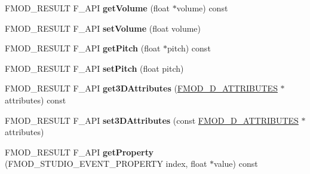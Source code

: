 \begin{DoxyCompactItemize}
\item 
\hypertarget{class_f_m_o_d_1_1_studio_1_1_event_instance_a12876c3f0379b18c434218aa504efe32}{F\+M\+O\+D\+\_\+\+R\+E\+S\+U\+L\+T F\+\_\+\+A\+P\+I {\bfseries get\+Volume} (float $\ast$volume) const }\label{class_f_m_o_d_1_1_studio_1_1_event_instance_a12876c3f0379b18c434218aa504efe32}

\item 
\hypertarget{class_f_m_o_d_1_1_studio_1_1_event_instance_af4c5ace0dce477110e154df958b27e21}{F\+M\+O\+D\+\_\+\+R\+E\+S\+U\+L\+T F\+\_\+\+A\+P\+I {\bfseries set\+Volume} (float volume)}\label{class_f_m_o_d_1_1_studio_1_1_event_instance_af4c5ace0dce477110e154df958b27e21}

\item 
\hypertarget{class_f_m_o_d_1_1_studio_1_1_event_instance_a3e74ea0004f54744ad382e274b712463}{F\+M\+O\+D\+\_\+\+R\+E\+S\+U\+L\+T F\+\_\+\+A\+P\+I {\bfseries get\+Pitch} (float $\ast$pitch) const }\label{class_f_m_o_d_1_1_studio_1_1_event_instance_a3e74ea0004f54744ad382e274b712463}

\item 
\hypertarget{class_f_m_o_d_1_1_studio_1_1_event_instance_ae03be8fea8e6318a62830cd0171ae2da}{F\+M\+O\+D\+\_\+\+R\+E\+S\+U\+L\+T F\+\_\+\+A\+P\+I {\bfseries set\+Pitch} (float pitch)}\label{class_f_m_o_d_1_1_studio_1_1_event_instance_ae03be8fea8e6318a62830cd0171ae2da}

\item 
\hypertarget{class_f_m_o_d_1_1_studio_1_1_event_instance_acadeee3ceb33e2d235f564c828645206}{F\+M\+O\+D\+\_\+\+R\+E\+S\+U\+L\+T F\+\_\+\+A\+P\+I {\bfseries get3\+D\+Attributes} (\hyperlink{struct_f_m_o_d__3_d___a_t_t_r_i_b_u_t_e_s}{F\+M\+O\+D\+\_\+D\+\_\+\+A\+T\+T\+R\+I\+B\+U\+T\+E\+S} $\ast$attributes) const }\label{class_f_m_o_d_1_1_studio_1_1_event_instance_acadeee3ceb33e2d235f564c828645206}

\item 
\hypertarget{class_f_m_o_d_1_1_studio_1_1_event_instance_a8123a7be145637030b9e3e54da227ddf}{F\+M\+O\+D\+\_\+\+R\+E\+S\+U\+L\+T F\+\_\+\+A\+P\+I {\bfseries set3\+D\+Attributes} (const \hyperlink{struct_f_m_o_d__3_d___a_t_t_r_i_b_u_t_e_s}{F\+M\+O\+D\+\_\+D\+\_\+\+A\+T\+T\+R\+I\+B\+U\+T\+E\+S} $\ast$attributes)}\label{class_f_m_o_d_1_1_studio_1_1_event_instance_a8123a7be145637030b9e3e54da227ddf}

\item 
\hypertarget{class_f_m_o_d_1_1_studio_1_1_event_instance_a2f087be105f3dda6ccd9f6bd41847fd3}{F\+M\+O\+D\+\_\+\+R\+E\+S\+U\+L\+T F\+\_\+\+A\+P\+I {\bfseries get\+Property} (F\+M\+O\+D\+\_\+\+S\+T\+U\+D\+I\+O\+\_\+\+E\+V\+E\+N\+T\+\_\+\+P\+R\+O\+P\+E\+R\+T\+Y index, float $\ast$value) const }\label{class_f_m_o_d_1_1_studio_1_1_event_instance_a2f087be105f3dda6ccd9f6bd41847fd3}


\end{DoxyCompactItemize}
